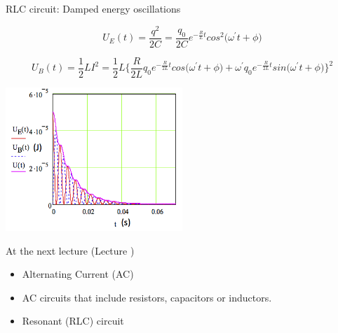 \begin{frame}{RLC circuit: Damped energy oscillations}

\begin{equation*}
  U_E(t) = \frac{q^2}{2C} = \frac{q_0}{2C} e^{-\frac{R}{L}t} cos^{2}\Big(\omega^{\prime} t + \phi \Big)
\end{equation*}

\begin{equation*}
  U_B(t) = \frac{1}{2}LI^2 = \frac{1}{2}L
                 \Big\{
                     \frac{R}{2L} q_0 e^{-\frac{R}{2L}t} cos\Big(\omega^{\prime} t + \phi \Big) +
                     \omega^{\prime} q_0 e^{-\frac{R}{2L}t} sin\Big(\omega^{\prime} t + \phi \Big)
                  \Big\}^2
\end{equation*}

\begin{center}
     \includegraphics[width=0.50\textwidth]{./images/misc/UtRLC.png}\\
\end{center}

\end{frame}



%
%

\renewcommand{\lecturesummarytitle}{Main points to remember }


%
%

\begin{frame}{At the next lecture (Lecture \nextlecture)}

\begin{itemize}
   \item Alternating Current (AC)
   \item AC circuits that include resistors, capacitors or inductors.
   \item Resonant (RLC) circuit
\end{itemize}

\end{frame}

%
%



